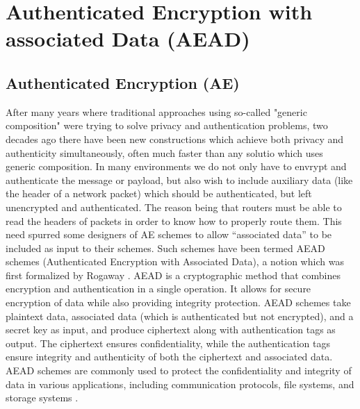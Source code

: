 \section{Authenticated Encryption with associated Data (AEAD)}
\subsection{Authenticated Encryption (AE)}
After many years where traditional approaches using so-called "generic composition" were trying to solve privacy and authentication problems, two decades ago there have been new constructions which achieve both privacy and authenticity simultaneously, often much faster than any solutio which uses generic composition.
\newline
\newline
In many environments we do not only have to envrypt and authenticate the message or payload, but also wish to include auxiliary data (like the header of a network packet) which should be authenticated, but left unencrypted and authenticated. \cite{Black2005}
The reason being that routers must be able to read the headers of packets in order to know how to properly route them. This need spurred some designers of AE schemes to allow “associated data” to be included as input to their schemes. Such schemes have been termed AEAD schemes (Authenticated Encryption with Associated Data), a notion which was first formalized by Rogaway \cite{10.1145/586110.586125}.
\newline
AEAD is a cryptographic method that combines encryption and authentication in a single operation. It allows for secure encryption of data while also providing integrity protection. AEAD schemes take plaintext data, associated data (which is authenticated but not encrypted), and a secret key as input, and produce ciphertext along with authentication tags as output. The ciphertext ensures confidentiality, while the authentication tags ensure integrity and authenticity of both the ciphertext and associated data. AEAD schemes are commonly used to protect the confidentiality and integrity of data in various applications, including communication protocols, file systems, and storage systems . \cite{Black2005}


